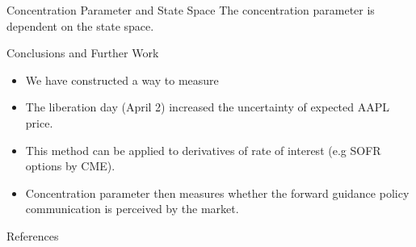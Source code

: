 \documentclass[10pt,aspectratio=43]{beamer}
\begin{document}
\begin{frame}{Concentration Parameter and State Space}
    The concentration parameter is dependent on the state space.
    
\end{frame}


\begin{frame}{Conclusions and Further Work}
    \begin{itemize}
        \item We have constructed a way to measure
        \item The liberation day (April 2) increased the uncertainty of expected AAPL price.
    \end{itemize}
\begin{itemize}
    \item This method can be applied to derivatives of rate of interest (e.g SOFR options by CME).
    \item Concentration parameter then measures whether the forward guidance policy communication is perceived by the market.
\end{itemize}


\end{frame}



\lastslide

\begin{frame}[allowframebreaks]{References}
    \renewcommand*{\bibfont}{\scriptsize}
    \printbibliography
\end{frame}


    
\end{document}
